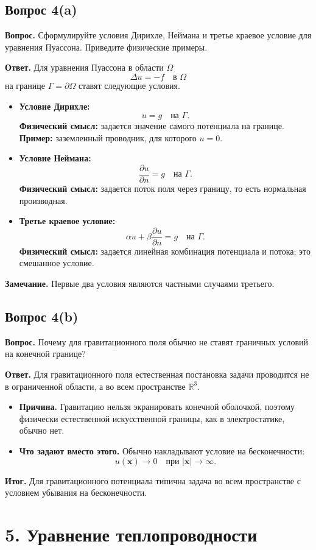 \documentclass[a4paper,12pt]{article}
\newcommand{\R}{\mathbb{R}}
\newcommand{\Question}[2]{\subsection*{Вопрос #1}\textbf{Вопрос.} #2}
\newcommand{\Answer}{\textbf{Ответ.}}
\begin{document}
\Question{4(a)}{Сформулируйте условия Дирихле, Неймана и третье краевое условие для уравнения Пуассона. Приведите физические примеры.}

\Answer
Для уравнения Пуассона в области $\Omega$
\[
\Delta u=-f \quad \text{в } \Omega
\]
на границе $\Gamma=\partial\Omega$ ставят следующие условия.

\begin{itemize}
  \item \textbf{Условие Дирихле:}
  \[
  u=g \quad \text{на } \Gamma.
  \]
  \textbf{Физический смысл:} задается значение самого потенциала на границе.  
  \textbf{Пример:} заземленный проводник, для которого $u=0$.

  \item \textbf{Условие Неймана:}
  \[
  \frac{\partial u}{\partial n}=g \quad \text{на } \Gamma.
  \]
  \textbf{Физический смысл:} задается поток поля через границу, то есть нормальная производная.

  \item \textbf{Третье краевое условие:}
  \[
  \alpha u+\beta\frac{\partial u}{\partial n}=g \quad \text{на } \Gamma.
  \]
  \textbf{Физический смысл:} задается линейная комбинация потенциала и потока; это смешанное условие.
\end{itemize}

\textbf{Замечание.} Первые два условия являются частными случаями третьего.

\Question{4(b)}{Почему для гравитационного поля обычно не ставят граничных условий на конечной границе?}

\Answer
Для гравитационного поля естественная постановка задачи проводится не в ограниченной области, а во всем пространстве $\R^3$.

\begin{itemize}
  \item \textbf{Причина.} Гравитацию нельзя экранировать конечной оболочкой, поэтому физически естественной искусственной границы, как в электростатике, обычно нет.
  \item \textbf{Что задают вместо этого.} Обычно накладывают условие на бесконечности:
  \[
  u(\mathbf{x})\to 0 \quad \text{при } |\mathbf{x}|\to\infty.
  \]
\end{itemize}

\textbf{Итог.} Для гравитационного потенциала типична задача во всем пространстве с условием убывания на бесконечности.

\section*{5. Уравнение теплопроводности}
\end{document}
